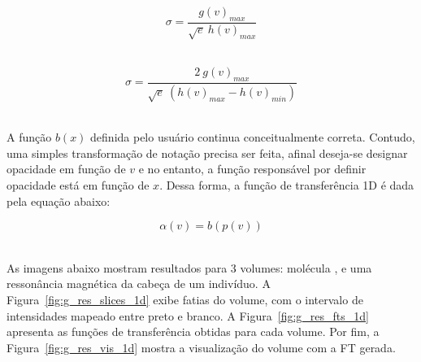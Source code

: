 \begin{equation} \label{eq:sigmav}
	\sigma = \frac{g(v)_{max}}{\sqrt{e}\ h(v)_{max}}
\end{equation} \

\begin{equation} \label{eq:sigmav2}
	\sigma = \frac{2\ g(v)_{max}}{\sqrt{e}\ (h(v)_{max} - h(v)_{min})}
\end{equation} \

	A função $b(x)$ definida pelo usuário continua conceitualmente correta. Contudo, uma simples transformação de notação precisa ser feita, afinal deseja-se designar opacidade em função de $v$ e no entanto, a função responsável por definir opacidade está em função de $x$. Dessa forma, a função de transferência 1D é dada pela equação abaixo:
	
\begin{equation} \label{eq:alpha}
	\alpha(v) = b(p(v))
\end{equation} \

	As imagens abaixo mostram resultados para 3 volumes: molécula ,  e uma ressonância magnética da cabeça de um indivíduo. A Figura~\ref{fig:g_res_slices_1d} exibe fatias do volume, com o intervalo de intensidades mapeado entre preto e branco. A Figura~\ref{fig:g_res_fts_1d} apresenta as funções de transferência obtidas para cada volume. Por fim, a Figura~\ref{fig:g_res_vis_1d} mostra a visualização do volume com a FT gerada.

	

%
    
